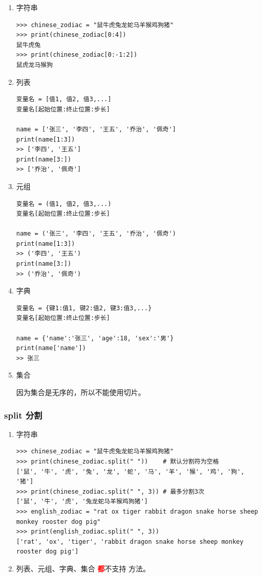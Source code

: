 \begin{enumerate}[label=\arabic*)]
    \item 字符串
\begin{lstlisting}[style=demostyle,numbers=none]
>>> chinese_zodiac = "鼠牛虎兔龙蛇马羊猴鸡狗猪"
>>> print(chinese_zodiac[0:4])
鼠牛虎兔
>>> print(chinese_zodiac[0:-1:2])
鼠虎龙马猴狗
\end{lstlisting}

    \item 列表
\begin{lstlisting}[style=demostyle,numbers=none]
变量名 = [值1, 值2, 值3,...]
变量名[起始位置:终止位置:步长]

name = ['张三', '李四', '王五', '乔治', '佩奇']
print(name[1:3])
>> ['李四', '王五']
print(name[3:])
>> ['乔治', '佩奇']
\end{lstlisting}

    \item 元组
\begin{lstlisting}[style=demostyle,numbers=none]
变量名 = (值1, 值2, 值3,...)
变量名[起始位置:终止位置:步长]

name = ('张三', '李四', '王五', '乔治', '佩奇')
print(name[1:3])
>> ('李四', '王五')
print(name[3:])
>> ('乔治', '佩奇')
\end{lstlisting}

    \item 字典
\begin{lstlisting}[style=demostyle,numbers=none]
变量名 = {键1:值1, 键2:值2, 键3:值3,...}
变量名[起始位置:终止位置:步长]

name = {'name':'张三', 'age':18, 'sex':'男'}
print(name['name'])
>> 张三
\end{lstlisting}

    \item 集合

    因为集合是无序的，所以不能使用切片。

\end{enumerate}

\subsubsection{split 分割}
\begin{enumerate}[label=\arabic*)]
    \item 字符串

\begin{lstlisting}[style=demostyle,numbers=none]
>>> chinese_zodiac = "鼠牛虎兔龙蛇马羊猴鸡狗猪"
>>> print(chinese_zodiac.split(" "))    # 默认分割符为空格
['鼠', '牛', '虎', '兔', '龙', '蛇', '马', '羊', '猴', '鸡', '狗', '猪']
>>> print(chinese_zodiac.split(" ", 3)) # 最多分割3次
['鼠', '牛', '虎', '兔龙蛇马羊猴鸡狗猪']
>>> english_zodiac = "rat ox tiger rabbit dragon snake horse sheep monkey rooster dog pig"
>>> print(english_zodiac.split(" ", 3))
['rat', 'ox', 'tiger', 'rabbit dragon snake horse sheep monkey rooster dog pig']
\end{lstlisting}

    \item 列表、元组、字典、集合 \textcolor{red}{\textbf{都}}不支持  方法。
\end{enumerate}

